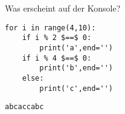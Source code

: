 \question[4] Was erscheint auf der Konsole?
\begin{lstlisting}
for i in range(4,10):
    if i % 2 $==$ 0:
        print('a',end='')
    if i % 4 $==$ 0:
        print('b',end='')
    else:
        print('c',end='')
\end{lstlisting}
\begin{solutionbox}{1cm}
\texttt{abcaccabc}
\end{solutionbox}
